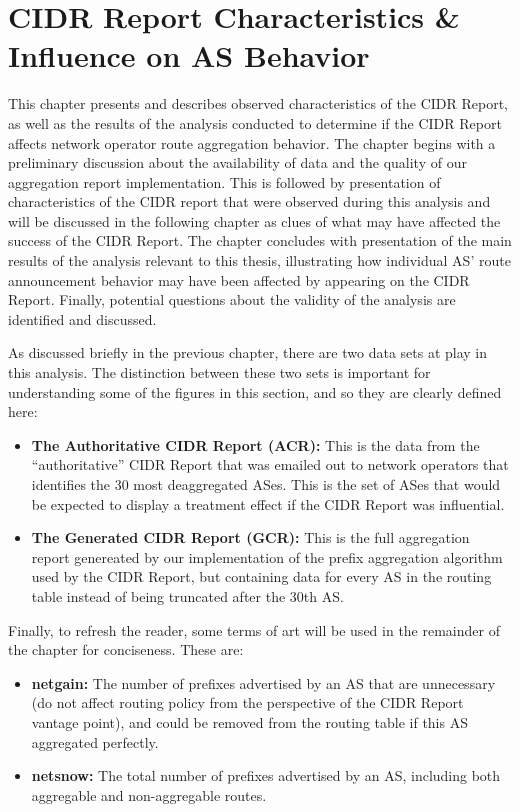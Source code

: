\chapter{CIDR Report Characteristics \& Influence on AS Behavior}
\label{chap:analysis}

This chapter presents and describes observed characteristics of the CIDR Report,
as well as the results of the analysis conducted to determine if the CIDR Report
affects network operator route aggregation behavior. The chapter begins with
a preliminary discussion about the availability of data and the quality of our
aggregation report implementation. This is followed by presentation of
characteristics of the CIDR report that were observed during this analysis and
will be discussed in the following chapter as clues of what may have affected
the success of the CIDR Report. The chapter concludes with presentation of the
main results of the analysis relevant to this thesis, illustrating how
individual AS' route announcement behavior may have been affected by appearing
on the CIDR Report. Finally, potential questions about the validity of the
analysis are identified and discussed.

As discussed briefly in the previous chapter, there are two data sets at play in
this analysis. The distinction between these two sets is important for
understanding some of the figures in this section, and so they are clearly
defined here:
\begin{itemize}
\item{\textbf{The Authoritative CIDR Report (ACR):} This is the data from the
``authoritative'' CIDR Report that was emailed out to network operators that
identifies the 30 most deaggregated ASes. This is the set of ASes that would be
expected to display a treatment effect if the CIDR Report was influential.}
\item{\textbf{The Generated CIDR Report (GCR):} This is the full aggregation
report genereated by our implementation of the prefix aggregation algorithm used
by the CIDR Report, but containing data for every AS in the routing table
instead of being truncated after the 30th AS.}
\end{itemize}

Finally, to refresh the reader, some terms of art will be used in the remainder
of the chapter for conciseness. These are:
\begin{itemize}
\item{\textbf{netgain:} The number of prefixes advertised by an AS that are
unnecessary (do not affect routing policy from the perspective of the CIDR
Report vantage point), and could be removed from the routing table if this AS
aggregated perfectly.}
\item{\textbf{netsnow:} The total number of prefixes advertised by an AS,
including both aggregable and non-aggregable routes.}
\end{itemize}


